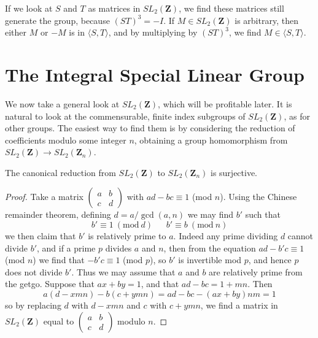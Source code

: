 If we look at $S$ and $T$ as matrices in $SL_2(\mathbf{Z})$, we find these matrices still generate the group, because $(ST)^3 = -I$. If $M \in SL_2(\mathbf{Z})$ is arbitrary, then either $M$ or $-M$ is in $\langle S ,T \rangle$, and by multiplying by $(ST)^3$, we find $M \in \langle S, T \rangle$.

\section{The Integral Special Linear Group}

We now take a general look at $SL_2(\mathbf{Z})$, which will be profitable later. It is natural to look at the commensurable, finite index subgroups of $SL_2(\mathbf{Z})$, as for other groups. The easiest way to find them is by considering the reduction of coefficients modulo some integer $n$, obtaining a group homomorphism from $SL_2(\mathbf{Z}) \to SL_2(\mathbf{Z}_n)$.

\begin{theorem}
    The canonical reduction from $SL_2(\mathbf{Z})$ to $SL_2(\mathbf{Z}_n)$ is surjective.
\end{theorem}
\begin{proof}
    Take a matrix $\left( \begin{smallmatrix} a & b \\ c & d \end{smallmatrix} \right)$ with $ad - bc \equiv 1$ (mod $n$). Using the Chinese remainder theorem, defining $d = a/\gcd(a,n)$ we may find $b'$ such that
    \[ b' \equiv 1\ (\text{mod}\ d)\ \ \ \ \ \ \ b' \equiv b\ (\text{mod}\ n) \]
    we then claim that $b'$ is relatively prime to $a$. Indeed any prime dividing $d$ cannot divide $b'$, and if a prime $p$ divides $a$ and $n$, then from the equation $ad - b'c \equiv 1$ (mod $n$) we find that $- b'c \equiv 1$ (mod $p$), so $b'$ is invertible mod $p$, and hence $p$ does not divide $b'$. Thus we may assume that $a$ and $b$ are relatively prime from the getgo. Suppose that $ax + by = 1$, and that $ad - bc = 1 + mn$. Then
    \[ a(d - xmn) - b(c + ymn) = ad - bc - (ax + by)nm = 1 \]
    so by replacing $d$ with $d - xmn$ and $c$ with $c + ymn$, we find a matrix in $SL_2(\mathbf{Z})$ equal to $\left( \begin{smallmatrix} a & b \\ c & d \end{smallmatrix} \right)$ modulo $n$.
\end{proof}

